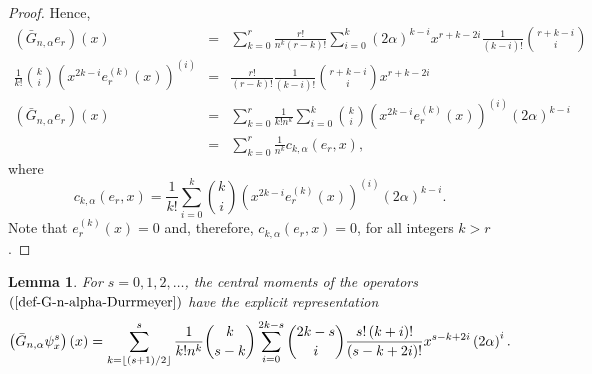 \documentclass[11pt,a4paper]{article}
\newtheorem{lemma}[theorem]{Lemma}
\begin{document}
\begin{proof}
Hence, 
\begin{eqnarray*}
\left( \bar{G}_{n,\alpha }e_{r}\right) \left( x\right) &=&\sum_{k=0}^{r}%
\frac{r!}{n^{k}\left( r-k\right) !}\sum_{i=0}^{k}\left( 2\alpha \right)
^{k-i}x^{r+k-2i}\frac{1}{\left( k-i\right) !}\binom{r+k-i}{i} \\
\frac{1}{k!}\binom{k}{i}\left( x^{2k-i}e_{r}^{\left( k\right) }\left(
x\right) \right) ^{\left( i\right) } &=&\frac{r!}{\left( r-k\right) !}\frac{1%
}{\left( k-i\right) !}\binom{r+k-i}{i}x^{r+k-2i} \\
\left( \bar{G}_{n,\alpha }e_{r}\right) \left( x\right) &=&\sum_{k=0}^{r}%
\frac{1}{k!n^{k}}\sum_{i=0}^{k}\binom{k}{i}\left( x^{2k-i}e_{r}^{\left(
k\right) }\left( x\right) \right) ^{\left( i\right) }\left( 2\alpha \right)
^{k-i} \\
&=&\sum_{k=0}^{r}\frac{1}{n^{k}}c_{k,\alpha }\left( e_{r},x\right) ,
\end{eqnarray*}%
where 
\begin{equation*}
c_{k,\alpha }\left( e_{r},x\right) =\frac{1}{k!}\sum_{i=0}^{k}\binom{k}{i}%
\left( x^{2k-i}e_{r}^{\left( k\right) }\left( x\right) \right) ^{\left(
i\right) }\left( 2\alpha \right) ^{k-i}.
\end{equation*}%
Note that $e_{r}^{\left( k\right) }\left( x\right) =0$ and, therefore, $%
c_{k,\alpha }\left( e_{r},x\right) =0$, for all integers $k>r$.
\end{proof}

\begin{lemma}
\label{lemma-central-moments}For $s=0,1,2,\ldots $, the central moments of
the operators $\left( \ref{def-G-n-alpha-Durrmeyer}\right) $ have the explicit
representation 
\begin{equation*}
\left( \bar{G}_{n,\alpha }\psi _{x}^{s}\right) \left( x\right)
=\sum_{k=\left\lfloor \left( s+1\right) /2\right\rfloor }^{s}\frac{1}{k!n^{k}%
}\binom{k}{s-k}\sum_{i=0}^{2k-s}\binom{2k-s}{i}\frac{s!\left( k+i\right) !}{%
\left( s-k+2i\right) !}x^{s-k+2i}\left( 2\alpha \right) ^{i}.
\end{equation*}
\end{lemma}
\end{document}
